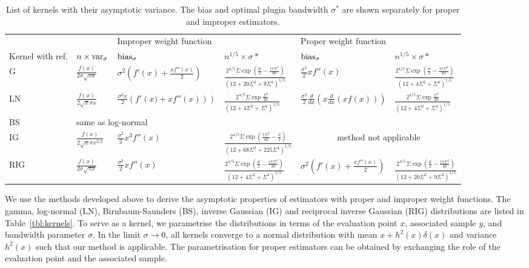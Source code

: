 \begin{table}
\begin{tabular*}{0.9\textheight}{@{\extracolsep{\fill}}llllll}
 &  & \multicolumn{2}{l}{Improper weight function} & \multicolumn{2}{l}{Proper weight function}\tabularnewline
Kernel with ref. & $n\times\mathrm{var}_{\sigma}$  & $\mathrm{bias}_{\sigma}$  & $n^{1/5}\times\sigma*$ & $\mathrm{bias}_{\sigma}$  & $n^{1/5}\times\sigma*$\tabularnewline
\hline 
G \cite{Chen2000,Jeon2014} & $\frac{f(x)}{2\sigma\sqrt{\pi x}}$  & $\sigma^{2}\left(f'(x)+\frac{xf''(x)}{2}\right)$ & $\frac{2^{4/5}\Sigma\exp\left(\frac{\mu}{2}-\frac{17\Sigma^{2}}{40}\right)}{\left(12+20\Sigma^{2}+9\Sigma^{4}\right)^{1/5}}$ & $\frac{\sigma^{2}}{2}xf''\left(x\right)$ & $\frac{2^{4/5}\Sigma\exp\left(\frac{\mu}{2}-\frac{17\Sigma^{2}}{40}\right)}{\left(12+4\Sigma^{2}+\Sigma^{4}\right)^{1/5}}$\tabularnewline
LN \cite{Jin2003} & $\frac{f(x)}{2\sqrt{\pi}\sigma x}$  & $\frac{\sigma^{2}x}{2}\left(f'\left(x)+xf''\left(x\right)\right)\right)$ & $\frac{2^{4/5}\Sigma\exp\frac{\Sigma^{2}}{20}}{\left(12+4\Sigma^{2}+\Sigma^{4}\right)^{1/5}}$ & $\frac{\sigma^{2}}{2}\frac{d}{dx}\left(x\frac{d}{dx}\left(xf\left(x\right)\right)\right)$ & $\frac{2^{4/5}\Sigma\exp\frac{\Sigma^{2}}{20}}{\left(12+4\Sigma^{2}+\Sigma^{4}\right)^{1/5}}$\tabularnewline
BS \cite{Jin2003} & \multicolumn{5}{l}{same as log-normal}\tabularnewline
IG \cite{Scaillet2004} & $\frac{f(x)}{2\sqrt{\pi}\sigma x^{3/2}}$  & $\frac{\sigma^{2}}{2}x^{3}f''\left(x\right)$ & $\frac{2^{4/5}\Sigma\exp\left(\frac{7\Sigma^{2}}{40}-\frac{\mu}{2}\right)}{\left(12+68\Sigma^{2}+225\Sigma^{4}\right)^{1/5}}$ & \multicolumn{2}{c}{method not applicable}\tabularnewline
RIG \cite{Scaillet2004} & $\frac{f(x)}{2\sigma\sqrt{\pi x}}$  & $\frac{\sigma^{2}}{2}xf''\left(x\right)$ & $\frac{2^{4/5}\Sigma\exp\left(\frac{\mu}{2}-\frac{17\Sigma^{2}}{40}\right)}{\left(12+4\Sigma^{2}+\Sigma^{4}\right)^{1/5}}$ & $\sigma^{2}\left(f'(x)+\frac{xf''(x)}{2}\right)$ & $\frac{2^{4/5}\Sigma\exp\left(\frac{\mu}{2}-\frac{17\Sigma^{2}}{40}\right)}{\left(12+20\Sigma^{2}+9\Sigma^{4}\right)^{1/5}}$\tabularnewline
\end{tabular*}

\vspace{2em}
\caption{\label{tbl:asymptotic-properties}List of kernels with their asymptotic variance. The bias and optimal plugin bandwidth $\sigma^{*}$ are shown separately for proper and improper estimators. \finishcaption}
\end{table}
We use the methods developed above to derive the asymptotic properties of estimators with proper and improper weight functions. The gamma, log-normal (LN), Birnbaum-Saunders (BS), inverse Gaussian (IG) and reciprocal inverse Gaussian (RIG) distributions are listed in Table~\ref{tbl:kernels}. To serve as a kernel, we parametrise the distributions in terms of the evaluation point $x$, associated sample $y$, and bandwidth parameter $\sigma$. In the limit $\sigma\rightarrow0$, all kernels converge to a normal distribution \cite{Johnson1994} with mean $x+h^{2}\left(x\right)\delta\left(x\right)$ and variance $h^{2}\left(x\right)$ such that our method is applicable. The parametrisation for proper estimators can be obtained by exchanging the role of the evaluation point and the associated sample.

